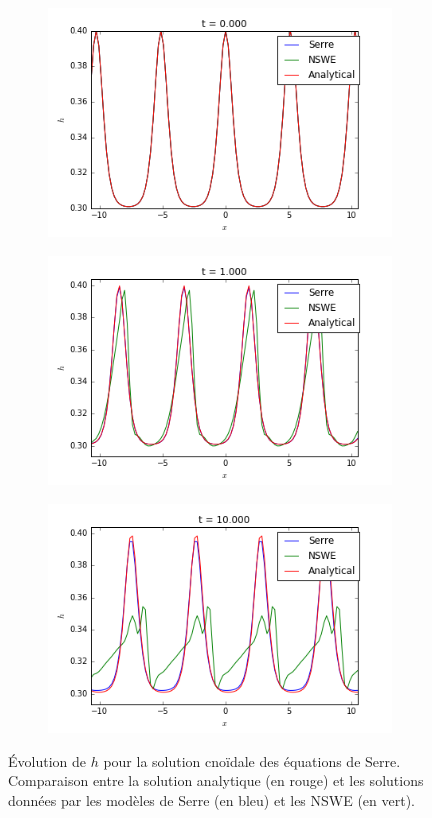 \begin{figure}[h!]
	\begin{subfigure}{.3\linewidth}
		\includegraphics[scale=.3]{figures/Serre/4x4cnoidal1h.png}	
	\end{subfigure}
	\begin{subfigure}{.3\linewidth}
		\includegraphics[scale=.3]{figures/Serre/4x4cnoidal2h.png}	
	\end{subfigure}
	\begin{subfigure}{.3\linewidth}
		\includegraphics[scale=.3]{figures/Serre/4x4cnoidal3h.png}	
	\end{subfigure}
	\caption{Évolution de $h$ pour la solution cnoïdale des équations de Serre. Comparaison entre la solution analytique (en rouge) et les solutions données par les modèles de Serre (en bleu) et les NSWE (en vert). \label{fig:cnoidalh}}
\end{figure}

